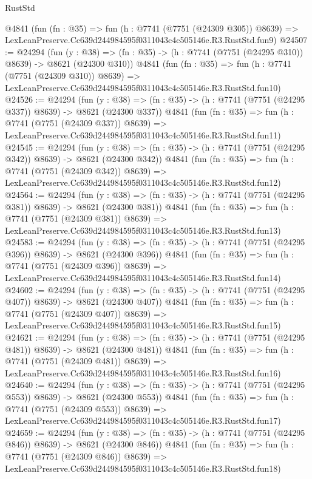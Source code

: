 \begin{lexlean}{RustStd}
\begin{coremodule}
    @4841
    (fun (fn : @35) =>
    fun (h : @7741 (@7751 (@24309 @305)) @8639) =>
    LexLeanPreserve.Cc639d244984595f0311043c4c505146e.R3.RustStd.fun9)
@24507 := @24294
    (fun (y : @38) => (fn : @35) -> (h : @7741 (@7751 (@24295 @310)) @8639) -> @8621 (@24300 @310))
    @4841
    (fun (fn : @35) =>
    fun (h : @7741 (@7751 (@24309 @310)) @8639) =>
    LexLeanPreserve.Cc639d244984595f0311043c4c505146e.R3.RustStd.fun10)
@24526 := @24294
    (fun (y : @38) => (fn : @35) -> (h : @7741 (@7751 (@24295 @337)) @8639) -> @8621 (@24300 @337))
    @4841
    (fun (fn : @35) =>
    fun (h : @7741 (@7751 (@24309 @337)) @8639) =>
    LexLeanPreserve.Cc639d244984595f0311043c4c505146e.R3.RustStd.fun11)
@24545 := @24294
    (fun (y : @38) => (fn : @35) -> (h : @7741 (@7751 (@24295 @342)) @8639) -> @8621 (@24300 @342))
    @4841
    (fun (fn : @35) =>
    fun (h : @7741 (@7751 (@24309 @342)) @8639) =>
    LexLeanPreserve.Cc639d244984595f0311043c4c505146e.R3.RustStd.fun12)
@24564 := @24294
    (fun (y : @38) => (fn : @35) -> (h : @7741 (@7751 (@24295 @381)) @8639) -> @8621 (@24300 @381))
    @4841
    (fun (fn : @35) =>
    fun (h : @7741 (@7751 (@24309 @381)) @8639) =>
    LexLeanPreserve.Cc639d244984595f0311043c4c505146e.R3.RustStd.fun13)
@24583 := @24294
    (fun (y : @38) => (fn : @35) -> (h : @7741 (@7751 (@24295 @396)) @8639) -> @8621 (@24300 @396))
    @4841
    (fun (fn : @35) =>
    fun (h : @7741 (@7751 (@24309 @396)) @8639) =>
    LexLeanPreserve.Cc639d244984595f0311043c4c505146e.R3.RustStd.fun14)
@24602 := @24294
    (fun (y : @38) => (fn : @35) -> (h : @7741 (@7751 (@24295 @407)) @8639) -> @8621 (@24300 @407))
    @4841
    (fun (fn : @35) =>
    fun (h : @7741 (@7751 (@24309 @407)) @8639) =>
    LexLeanPreserve.Cc639d244984595f0311043c4c505146e.R3.RustStd.fun15)
@24621 := @24294
    (fun (y : @38) => (fn : @35) -> (h : @7741 (@7751 (@24295 @481)) @8639) -> @8621 (@24300 @481))
    @4841
    (fun (fn : @35) =>
    fun (h : @7741 (@7751 (@24309 @481)) @8639) =>
    LexLeanPreserve.Cc639d244984595f0311043c4c505146e.R3.RustStd.fun16)
@24640 := @24294
    (fun (y : @38) => (fn : @35) -> (h : @7741 (@7751 (@24295 @553)) @8639) -> @8621 (@24300 @553))
    @4841
    (fun (fn : @35) =>
    fun (h : @7741 (@7751 (@24309 @553)) @8639) =>
    LexLeanPreserve.Cc639d244984595f0311043c4c505146e.R3.RustStd.fun17)
@24659 := @24294
    (fun (y : @38) => (fn : @35) -> (h : @7741 (@7751 (@24295 @846)) @8639) -> @8621 (@24300 @846))
    @4841
    (fun (fn : @35) =>
    fun (h : @7741 (@7751 (@24309 @846)) @8639) =>
    LexLeanPreserve.Cc639d244984595f0311043c4c505146e.R3.RustStd.fun18)

\end{coremodule}
\end{lexlean}
